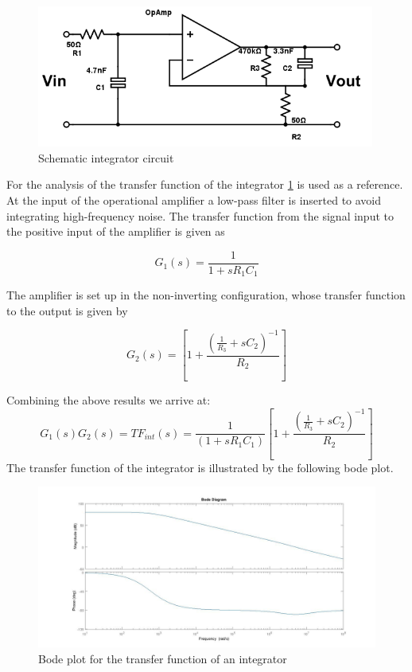 \begin{figure}[h!tb]
\includegraphics[width=0.99\textwidth]{figures/Method/integrator/circuit.png}
    \caption{Schematic integrator circuit}
    \label{fig.circuit}
    \end{figure}	

For the analysis of the transfer function of the integrator \ref{fig.circuit} is used as a reference.
At the input of the operational amplifier a low-pass filter is inserted to avoid integrating high-frequency noise.
The transfer function from the signal input to the positive input of the amplifier is given as

\begin{equation}
  G_1(s)=\frac{1}{1+sR_1C_1}
\end{equation}

The amplifier is set up in the non-inverting configuration, whose transfer function to the output is given by

\begin{equation}
 G_2(s)=\left[1+\frac{\left(\frac{1}{R_3}+sC_2\right)^{-1}}{R_2}\right]
\end{equation}

Combining the above results we arrive at:
\begin{equation}
	G_1(s)G_2(s)=TF_{int}(s)=\frac{1}{(1+s R_1 C_1)}\left[1+\frac{\left(\frac{1}{R_3}+sC_2\right)^{-1}}{R_2}\right]
\end{equation}
The transfer function of the integrator is illustrated by the following bode plot. 

\begin{figure}[h!tb]
\includegraphics[width=\textwidth]{figures/Method/integrator/transferfunction_int.jpg}
\caption[Kurze Abbildungsbeschreibung]{Bode plot for the transfer function of an integrator}
\label{fig.Bodeplot}
\end{figure}

